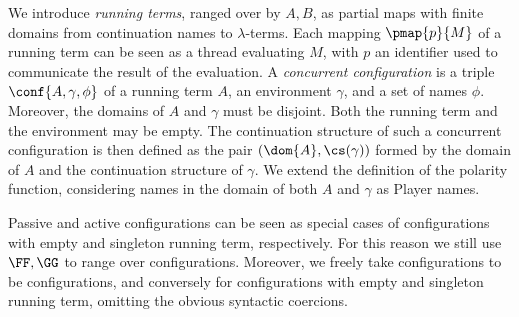 We introduce \emph{running terms}, ranged over by $A,B$,
as partial maps with finite domains 
from continuation names to $\lambda$-terms.
Each mapping $\pmap{p}{M}$ of a running term can be seen as
a thread evaluating $M$, with $p$ an identifier
used to communicate the result of the evaluation.
%
A \emph{concurrent configuration} is a triple $ \conf{A,\gamma,\phi}$ 
of a running term $A$, an environment 
$\gamma$, and a set of names $\phi$.
Moreover, the domains of $A$ and $\gamma$
must be disjoint.
Both the running term and the environment may be empty.
The continuation structure of such a concurrent configuration
is then defined as the pair $(\dom{A},\cs(\gamma))$
formed by the domain of $A$ and the continuation structure of $\gamma$.
We extend the definition of the polarity function,
considering names in the domain of both $A$ and $\gamma$ as Player names. 
%

% 


Passive and active configurations
can be seen as special cases of \COGS configurations with empty and singleton
running term, respectively.
For this reason we still use $\FF, \GG$ to range
over \COGS configurations. Moreover, we freely take  \AOGS
configurations to be  \COGS configurations, 
and conversely for \COGS configurations
with empty and singleton running term, 
omitting the obvious syntactic coercions. 

